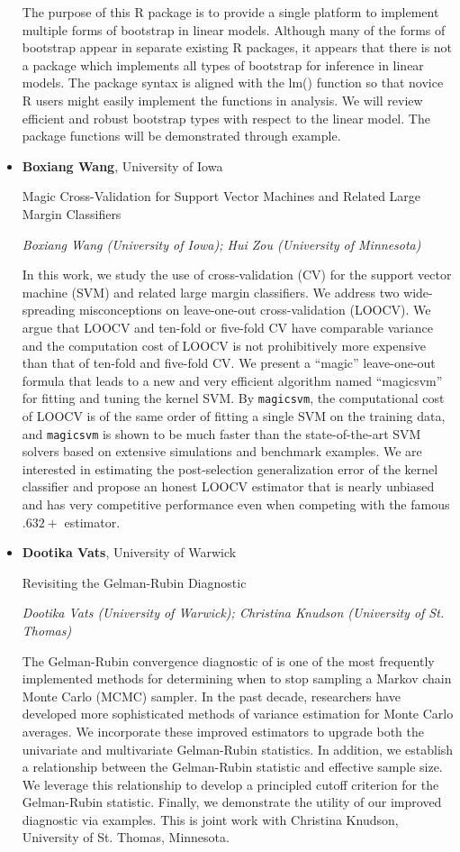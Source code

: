 \begin{itemize}
The purpose of this R package is to provide a single platform to implement multiple forms of bootstrap in linear models.  Although many of the forms of bootstrap appear in separate existing R packages, it appears that there is not a package which implements all types of bootstrap for inference in linear models.  The package syntax is aligned with the lm() function so that novice R users might easily implement the functions in analysis.  We will review efficient and robust bootstrap types with respect to the linear model.  The package functions will be demonstrated through example.

\item \textbf{Boxiang Wang}, University of Iowa

Magic Cross-Validation for Support Vector Machines and Related Large Margin Classifiers

\emph{\footnotesize Boxiang Wang (University of Iowa); Hui Zou (University of Minnesota)}

In this work, we study the use of cross-validation (CV) for the support vector machine (SVM) and related large margin classifiers. We address two wide-spreading misconceptions on leave-one-out cross-validation (LOOCV). We argue that LOOCV and ten-fold or five-fold CV have comparable variance and the computation cost of LOOCV is not prohibitively more expensive than that of ten-fold and five-fold CV. We present a ``magic'' leave-one-out formula that leads to a new and very efficient algorithm named ``magicsvm'' for fitting and tuning the kernel SVM. By \texttt{magicsvm}, the computational cost of LOOCV is of the same order of fitting a single SVM on the training data, and  \texttt{magicsvm} is shown to be much faster than the state-of-the-art SVM solvers based on extensive simulations and benchmark examples. We are interested in estimating the post-selection generalization error of the kernel classifier and propose an honest LOOCV estimator that is nearly unbiased and has very competitive performance even when competing with the famous $.632+$ estimator.

\item \textbf{Dootika Vats}, University of Warwick

Revisiting the Gelman-Rubin Diagnostic

\emph{\footnotesize Dootika Vats (University of Warwick); Christina Knudson (University of St. Thomas)}

The Gelman-Rubin convergence diagnostic of  is one of the most frequently implemented methods for determining when to stop sampling a Markov chain Monte Carlo (MCMC) sampler. In the past decade, researchers have developed more sophisticated methods of variance estimation for Monte Carlo averages. We incorporate these improved estimators to upgrade both the univariate and multivariate Gelman-Rubin statistics. In addition, we establish a relationship between the Gelman-Rubin statistic and effective sample size. We leverage this relationship to develop a principled cutoff criterion for the Gelman-Rubin statistic. Finally, we demonstrate the utility of our improved diagnostic via examples. This is joint work with Christina Knudson, University of St. Thomas, Minnesota.


\end{itemize}
